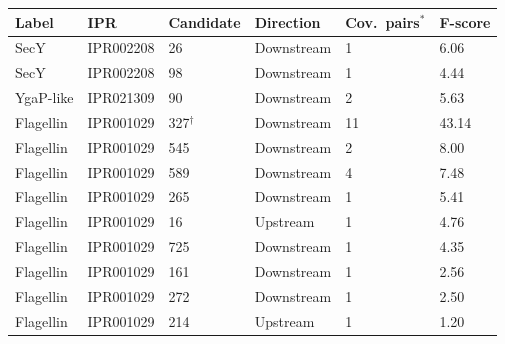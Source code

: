 \begin{tabular}{p{}p{}p{}p{}p{}p{}}
\hline
\textbf{Label} & \textbf{IPR} & \textbf{Candidate} & \textbf{Direction} & \textbf{Cov.\ pairs$^{*}$} & \textbf{F-score} \\
\hline
SecY & IPR002208 & 26 & Downstream & 1 & 6.06 \\
SecY & IPR002208 & 98 & Downstream & 1 & 4.44 \\
YgaP-like & IPR021309 & 90 & Downstream & 2 & 5.63 \\
Flagellin & IPR001029 & 327$^{\dagger}$ & Downstream & 11 & 43.14 \\
Flagellin & IPR001029 & 545 & Downstream & 2 & 8.00 \\
Flagellin & IPR001029 & 589 & Downstream & 4 & 7.48 \\
Flagellin & IPR001029 & 265 & Downstream & 1 & 5.41 \\
Flagellin & IPR001029 & 16 & Upstream & 1 & 4.76 \\
Flagellin & IPR001029 & 725 & Downstream & 1 & 4.35 \\
Flagellin & IPR001029 & 161 & Downstream & 1 & 2.56 \\
Flagellin & IPR001029 & 272 & Downstream & 1 & 2.50 \\
Flagellin & IPR001029 & 214 & Upstream & 1 & 1.20 \\
\hline
\end{tabular}
